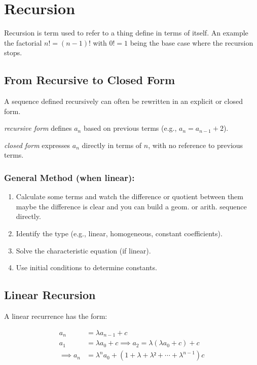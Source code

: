 \newpage
\section{Recursion}

Recursion is term used to refer to a thing define in terms
of itself. An example the factorial \(n! = (n - 1)!\) with \(0! = 1\) being the
base case where the recursion stops.

\subsection{From Recursive to Closed Form}

A sequence defined recursively can often be rewritten in an explicit or closed form.

\emph{recursive form} defines \( a_n \) based on previous terms (e.g., \( a_n = a_{n-1} + 2 \)).

\emph{closed form} expresses \( a_n \) directly in terms of \( n \), with no reference to previous terms.

\subsubsection*{General Method (when linear):}
\begin{enumerate}
    \item Calculate some terms and watch the difference or quotient between them
    maybe the difference is clear and you can build a geom. or arith. sequence directly.
    \item Identify the type (e.g., linear, homogeneous, constant coefficients).
    \item Solve the characteristic equation (if linear).
    \item Use initial conditions to determine constants.
\end{enumerate}

\subsection{Linear Recursion}

A linear recurrence has the form:

\begin{align*}
a_n & = \lambda a_{n -1} + c \\
a_1 & = \lambda a_0 + c \implies a_2 = \lambda (\lambda a_0 + c) + c \\
\implies a_n & = \lambda^n a_0 + (1 + \lambda + \lambda² + \cdots + \lambda^{n - 1})c
\end{align*}

